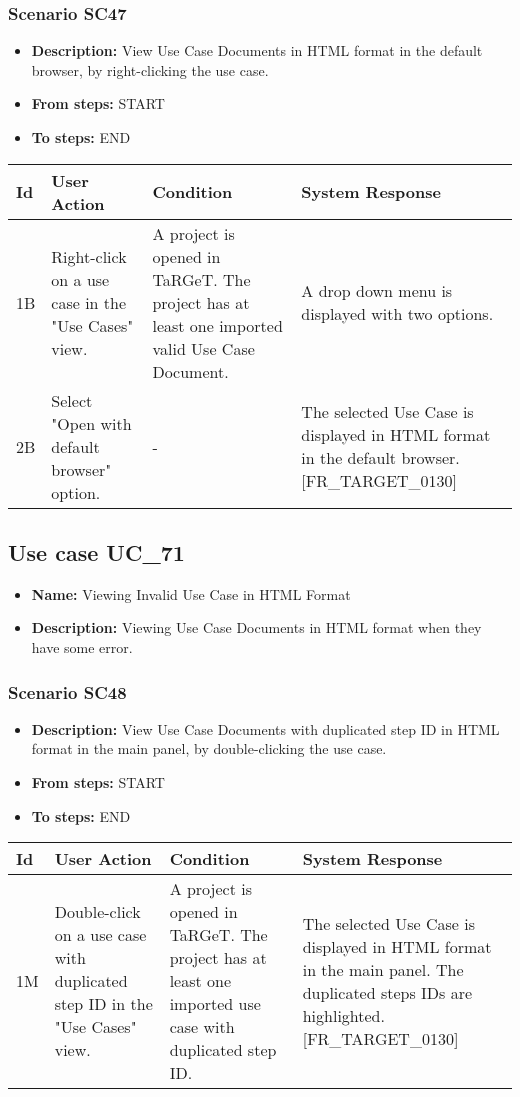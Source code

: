 \documentclass[a4paper,11pt]{article}
\newcommand{\bl}{\\ \hline}
\begin{document}
\subsubsection*{Scenario SC47}
\begin{itemize}
\item {\bf Description:} View Use Case Documents in HTML format in the default
					browser, by right-clicking the use case.
\item {\bf From steps:} START
\item {\bf To steps:} END
\end{itemize}
\begin{tabular}{|p{0.4in}|p{1.5in}|p{1.5in}|p{1.5in}|}
\hline
Id & User Action & Condition & System Response \bl 
1B & Right-click on a use case in the "Use Cases" view. & A project is opened in TaRGeT. The project has at least
						one imported valid Use Case Document. & A drop down menu is displayed with two options.
					\bl
2B & Select "Open with default browser" option. & - & The selected Use Case is displayed in HTML format in the
						default browser. [FR_TARGET_0130] \bl
\end{tabular}
\subsection*{Use case UC_71}
\begin{itemize}
\item {\bf Name: }Viewing Invalid Use Case in HTML Format
\item {\bf Description: }Viewing Use Case Documents in HTML format when they have
				some error.
\end{itemize}
\subsubsection*{Scenario SC48}
\begin{itemize}
\item {\bf Description:} View Use Case Documents with duplicated step ID in HTML
					format in the main panel, by double-clicking the use case.
				
\item {\bf From steps:} START
\item {\bf To steps:} END
\end{itemize}
\begin{tabular}{|p{0.4in}|p{1.5in}|p{1.5in}|p{1.5in}|}
\hline
Id & User Action & Condition & System Response \bl 
1M & Double-click on a use case with duplicated step ID in the
						"Use Cases" view.  & A project is opened in TaRGeT. The project has at least
						one imported use case with duplicated step ID.  & The selected Use Case is displayed in HTML format in the
						main panel. The duplicated steps IDs are highlighted.
						[FR_TARGET_0130]\bl
\end{tabular}
\end{document}
